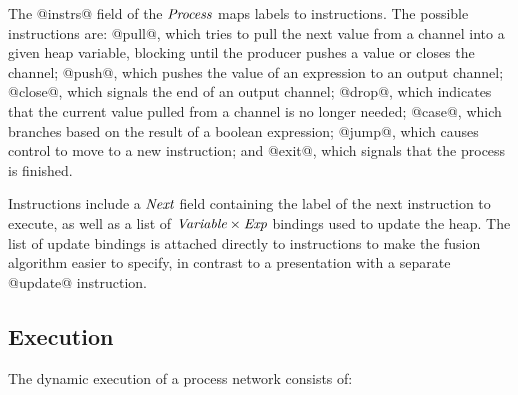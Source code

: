 The @instrs@ field of the $\textit{Process}$ maps labels to instructions.
The possible instructions are: @pull@, which tries to pull the next value from a channel into a given heap variable, blocking until the producer pushes a value or closes the channel; @push@, which pushes the value of an expression to an output channel; @close@, which signals the end of an output channel; @drop@, which indicates that the current value pulled from a channel is no longer needed; @case@, which branches based on the result of a boolean expression; @jump@, which causes control to move to a new instruction; and @exit@, which signals that the process is finished.

Instructions include a $\textit{Next}$ field containing the label of the next instruction to execute, as well as a list of $\textit{Variable} \times \textit{Exp}$ bindings used to update the heap.
The list of update bindings is attached directly to instructions to make the fusion algorithm easier to specify, in contrast to a presentation with a separate @update@ instruction.





\subsection{Execution}
\label{s:Process:Eval}

The dynamic execution of a process network consists of:

